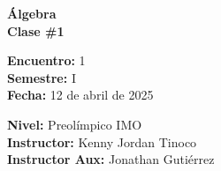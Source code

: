 \begin{center} \textbf
{
    \Large Álgebra \\ \vspace{2mm}Clase \#1
}
\end{center}

\begin{multicols}{2}
{
    \textbf{Encuentro:} 1\\
    \textbf{Semestre:} I\\
    \textbf{Fecha:} 12 de abril de 2025\\
    \begin{flushright}
        \textbf{Nivel:} Preolímpico IMO\\
        \textbf{Instructor:} Kenny Jordan Tinoco\\
        \textbf{Instructor Aux:} Jonathan Gutiérrez
    \end{flushright}
}
\end{multicols}

\thispagestyle{first-page-style}